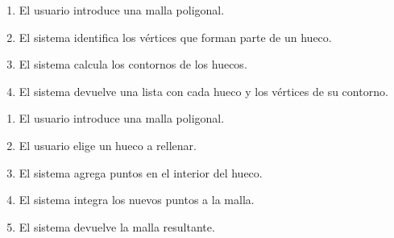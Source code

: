 		\CUNormal
		\begin{enumerate}
			\item El usuario introduce una malla poligonal.
			\item El sistema identifica los vértices que forman parte de un hueco.  %
			\item El sistema calcula los contornos de los huecos.
			\item El sistema devuelve una lista con cada hueco y los vértices de su contorno.
		\end{enumerate}

		\CUNormal
		\begin{enumerate}
			\item El usuario introduce una malla poligonal.
			\item El usuario elige un hueco a rellenar.  %
			\item El sistema agrega puntos en el interior del hueco.
			\item El sistema integra los nuevos puntos a la malla.
			\item El sistema devuelve la malla resultante.
		\end{enumerate}
